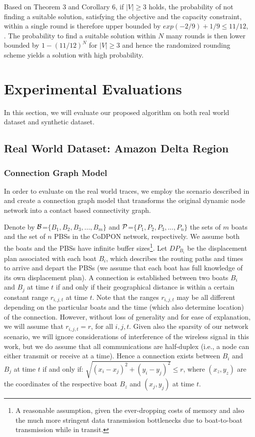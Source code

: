 \documentclass[conference]{IEEEtran}
\begin{document}
Based on Theorem 3 and Corollary 6, if $|V| \ge 3$ holds, the probability of not finding a suitable solution, satisfying the objective and the capacity constraint, within a single round is therefore upper bounded by $exp(−2/9) + 1/9 \le 11/12$, . The probability to find a suitable solution within $N$ many rounds is then lower bounded by $1 − (11/12)^N$ for $|V| \ge 3$ and hence the randomized rounding scheme yields a solution with high probability. 



\section{Experimental Evaluations}
In this section, we will evaluate our proposed algorithm on both real world dataset and synthetic dataset. 

\subsection{Real World Dataset: Amazon Delta Region}

\subsubsection{Connection Graph Model}

In order to evaluate on the real world traces, we employ the scenario described in \cite{LiuJAERC15} and create a connection graph model that transforms the original dynamic node network into a contact based connectivity graph.

Denote by $\cal B$=$\{B_1,B_2,B_3, ... ,B_m\}$ and $\cal P$=$\{P_1,P_2,P_3, ... ,P_n\}$ the sets of $m$ boats and the set of $n$ PBSs in the CoDPON network, respectively. We assume both the boats and the PBSs have infinite buffer sizes\footnote{A reasonable assumption, given the ever-dropping costs of memory and also the much more stringent data transmission bottlenecks due to boat-to-boat transmission while in transit.}. Let $DP_{B_i}$ be the displacement plan associated with each boat $B_i$, which describes the routing paths and times to arrive and depart the PBSs (we assume that each boat has full knowledge of its own displacement plan). A connection is established between two boats $B_i$ and $B_j$ at time $t$ if and only if their geographical distance is within a certain constant range $r_{i,j,t}$ at time $t$. Note that the ranges $r_{i,j,t}$ may be all different depending on the particular boats and the time (which also determine location) of the connection. However, without loss of generality and for ease of explanation, we will assume that $r_{i,j,t}=r$, for all $i,j,t$.  Given also the sparsity of our network scenario, we will ignore considerations of interference of the wireless signal in this work, but we do assume that all communications are half-duplex (i.e., a node can either transmit or receive at a time). Hence a connection exists between $B_i$ and $B_j$ at time $t$ if and only if: $\sqrt{(x_i - x_j)^2 + (y_i - y_j)^2} \leq r$, where $(x_z,y_z)$ are the coordinates of the respective boat  $B_z$ and $(x_j,y_j)$ at time $t$.
\end{document}
